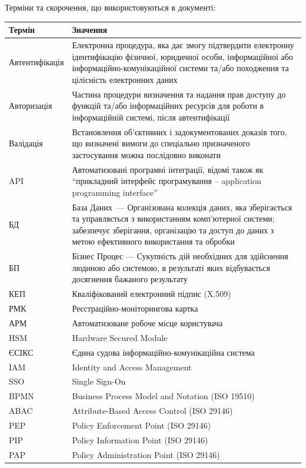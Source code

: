 \documentclass{article}
\begin{document}
Терміни та скорочення, що використовуються в документі:

\begin{longtable}{p{4cm}p{10cm}}
\toprule
\textbf{Термін} & \textbf{Значення} \\
\midrule
Автентифікація & Електронна процедура, яка дає змогу підтвердити електронну ідентифікацію фізичної, юридичної особи, інформаційної або інформаційно-комунікаційної системи та/або походження та цілісність електронних даних \\
Авторизація & Частина процедури визначення та надання прав доступу до функцій та/або інформаційних ресурсів для роботи в інформаційній системі, після автентифікації \\
Валідація & Встановлення об’єктивних і задокументованих доказів того, що визначені вимоги до спеціально призначеного застосування можна послідовно виконати \\
API & Автоматизовані програмні інтеграції, відомі також як “прикладний інтерфейс програмування – application programming interface” \\
БД & База Даних — Організована колекція даних, яка зберігається та управляється з використанням комп'ютерної системи; забезпечує зберігання, організацію та доступ до даних з метою ефективного використання та обробки \\
БП & Бізнес Процес — Сукупність дій необхідних для здійснення людиною або системою, в результаті яких відбувається досягнення бажаного результату \\
КЕП & Кваліфікований електронний підпис (X.509) \\
РМК & Реєстраційно-моніторингова картка \\
АРМ & Автоматизоване робоче місце користувача \\
HSM & Hardware Secured Module \\
ЄСІКС & Єдина судова інформаційно-комунікаційна система \\
IAM & Identity and Access Management \\
SSO & Single Sign-On \\
BPMN & Business Process Model and Notation (ISO 19510) \\
ABAC & Attribute-Based Access Control (ISO 29146) \\
PEP & Policy Enforcement Point (ISO 29146) \\
PIP & Policy Information Point (ISO 29146) \\
PAP & Policy Administration Point (ISO 29146) \\
\bottomrule
\end{longtable}
\end{document}
